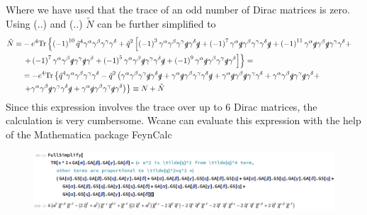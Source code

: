 Where we have used that the trace of an odd number of Dirac matrices is zero. Using (..) and (..) $\tilde{N}$ can be further simplified to
\begin{align*}
\tilde{N} = & -e^4 \mathrm{Tr} \left\lbrace \left( -1 \right)^{10} \tilde{q}^4 \gamma^{\alpha} \gamma^{\beta} \gamma^{\gamma} \gamma^{\delta} + \tilde{q}^2 \left[ \left( -1 \right) ^3  \gamma^{\alpha} \gamma^{\beta} \gamma^{\gamma} \slashed{q} \gamma^{\delta} \slashed{q}  + \left( -1 \right)^7 \gamma^{\alpha} \slashed{q} \gamma^{\beta} \gamma^{\gamma} \gamma^{\delta} \slashed{q} + \left( -1 \right)^{11} \gamma^{\alpha} \slashed{q} \gamma^{\beta} \slashed{q} \gamma^{\gamma} \gamma^{\delta} + \right. \right. & \\
& \left. \left. + \left( -1 \right)^7 \gamma^{\alpha} \gamma^{\beta} \slashed{q} \gamma^{\gamma} \slashed{q} \gamma^{\delta} + \left( -1 \right)^5 \gamma^{\alpha} \gamma^{\beta} \slashed{q} \gamma^{\gamma} \gamma^{\delta} \slashed{q} + \left( -1 \right)^9 \gamma^{\alpha} \slashed{q} \gamma^{\beta} \gamma^{\gamma} \slashed{q} \gamma^{\delta} \right] \right\rbrace = & \\
& = -e^4 \mathrm{Tr} \left\lbrace \tilde{q}^4 \gamma^{\alpha} \gamma^{\beta} \gamma^{\gamma} \gamma^{\delta} - \tilde{q}^2 \left( \gamma^{\alpha} \gamma^{\beta} \gamma^{\gamma} \slashed{q} \gamma^{\delta} \slashed{q} + \gamma^{\alpha} \slashed{q} \gamma^{\beta} \gamma^{\gamma} \gamma^{\delta} \slashed{q} + \gamma^{\alpha} \slashed{q} \gamma^{\beta} \slashed{q} \gamma^{\gamma} \gamma^{\delta} + \gamma^{\alpha} \gamma^{\beta} \slashed{q} \gamma^{\gamma} \slashed{q} \gamma^{\delta} + \right. \right. & \\
& \left. \left. + \gamma^{\alpha} \gamma^{\beta} \slashed{q} \gamma^{\gamma} \gamma^{\delta} \slashed{q} + \gamma^{\alpha} \slashed{q} \gamma^{\beta} \gamma^{\gamma} \slashed{q} \gamma^{\delta} \right) \right\rbrace \equiv N + \tilde{N} &
\end{align*}
Since this expression involves the trace over up to 6 Dirac matrices, the calculation is very cumbersome. Wcane can evaluate this expression with the help of the Mathematica package FeynCalc \cite{FeynCalc,FeynCalc2} 
\begin{figure}[h!]
  \begin{center}
    \includegraphics[width=1.0\textwidth]{Figures/Trace_4ptfct_Mathematica}
  \end{center}
  \setlength{\belowcaptionskip}{-20pt}
  \caption*{}
\end{figure} \\
